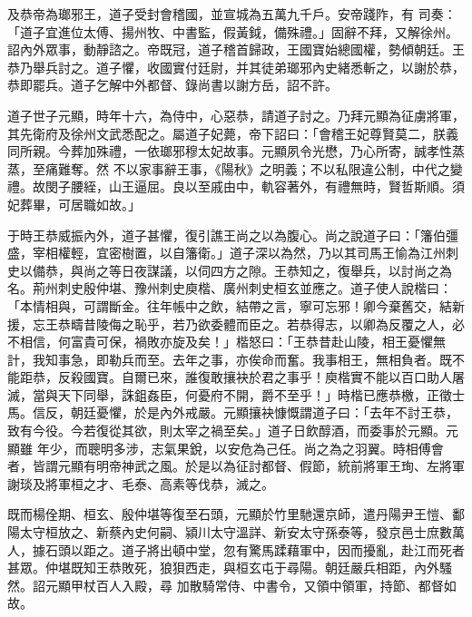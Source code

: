 \begin{pinyinscope}
 及恭帝為瑯邪王，道子受封會稽國，並宣城為五萬九千戶。安帝踐阼，有
 司奏：「道子宜進位太傅、揚州牧、中書監，假黃鉞，備殊禮。」固辭不拜，又解徐州。詔內外眾事，動靜諮之。帝既冠，道子稽首歸政，王國寶始總國權，勢傾朝廷。王恭乃舉兵討之。道子懼，收國實付廷尉，并其徒弟瑯邪內史緒悉斬之，以謝於恭，恭即罷兵。道子乞解中外都督、錄尚書以謝方岳，詔不許。



 道子世子元顯，時年十六，為侍中，心惡恭，請道子討之。乃拜元顯為征虜將軍，其先衛府及徐州文武悉配之。屬道子妃薨，帝下詔曰：「會稽王妃尊賢莫二，朕義同所親。今葬加殊禮，一依瑯邪穆太妃故事。元顯夙令光懋，乃心所寄，誠孝性蒸蒸，至痛難奪。然
 不以家事辭王事，《陽秋》之明義；不以私限違公制，中代之變禮。故閔子腰絰，山王逼屈。良以至戚由中，軌容著外，有禮無時，賢哲斯順。須妃葬畢，可居職如故。」



 于時王恭威振內外，道子甚懼，復引譙王尚之以為腹心。尚之說道子曰：「籓伯彊盛，宰相權輕，宜密樹置，以自籓衛。」道子深以為然，乃以其司馬王愉為江州刺史以備恭，與尚之等日夜謀議，以伺四方之隙。王恭知之，復舉兵，以討尚之為名。荊州刺史殷仲堪、豫州刺史庾楷、廣州刺史桓玄並應之。道子使人說楷曰：「本情相與，可謂斷金。往年帳中之飲，結帶之言，寧可忘邪！卿今棄舊交，結新
 援，忘王恭疇昔陵侮之恥乎，若乃欲委體而臣之。若恭得志，以卿為反覆之人，必不相信，何富貴可保，禍敗亦旋及矣！」楷怒曰：「王恭昔赴山陵，相王憂懼無計，我知事急，即勒兵而至。去年之事，亦俟命而奮。我事相王，無相負者。既不能距恭，反殺國寶。自爾已來，誰復敢攘袂於君之事乎！庾楷實不能以百口助人屠滅，當與天下同舉，誅鉏姦臣，何憂府不開，爵不至乎！」時楷已應恭檄，正徵士馬。信反，朝廷憂懼，於是內外戒嚴。元顯攘袂慷慨謂道子曰：「去年不討王恭，致有今役。今若復從其欲，則太宰之禍至矣。」道子日飲醇酒，而委事於元顯。元顯雖
 年少，而聰明多涉，志氣果銳，以安危為己任。尚之為之羽翼。時相傅會者，皆謂元顯有明帝神武之風。於是以為征討都督、假節，統前將軍王珣、左將軍謝琰及將軍桓之才、毛泰、高素等伐恭，滅之。



 既而楊佺期、桓玄、殷仲堪等復至石頭，元顯於竹里馳還京師，遣丹陽尹王愷、鄱陽太守桓放之、新蔡內史何嗣、潁川太守溫詳、新安太守孫泰等，發京邑士庶數萬人，據石頭以距之。道子將出頓中堂，忽有驚馬蹂藉軍中，因而擾亂，赴江而死者甚眾。仲堪既知王恭敗死，狼狽西走，與桓玄屯于尋陽。朝廷嚴兵相距，內外騷然。詔元顯甲杖百人入殿，尋
 加散騎常侍、中書令，又領中領軍，持節、都督如故。




\end{pinyinscope}
